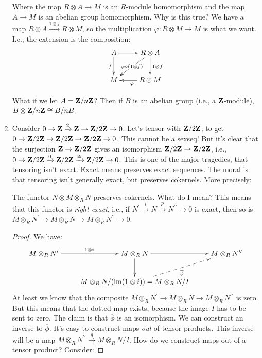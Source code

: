 \begin{enumerate}
Where the map $R\otimes A\to M$ is an $R$-module homomorphism and the map $A\to M$ is an abelian group homomorphism. Why is this true? We have a map $R\otimes A\xrightarrow{1\otimes f}R\otimes M$, so the multiplication $\varphi:R\otimes M\to M$ is what we want. I.e., the extension is the composition:
\begin{equation*}
\xymatrix{A\ar[r]\ar[d]_f & R\otimes A\ar[d]^{1\otimes f}\ar[dl]|{\varphi\circ(1\otimes f)}\\
M & R\otimes M\ar[l]^{\varphi}}
\end{equation*}
\begin{example}
What if we let $A=\mathbf Z/n\mathbf Z$? Then if $B$ is an abelian group (i.e., a $\mathbf Z$-module), $B\otimes \mathbf Z/n\mathbf Z\cong B/nB$.
\end{example}
\item Consider $0\to \mathbf Z\xrightarrow{2}\mathbf Z\to \mathbf Z/2\mathbf Z\to 0$. Let's tensor with $\mathbf Z/2\mathbf Z$, to get $0\to \mathbf Z/2\mathbf Z\to\mathbf Z/2\mathbf Z\to\mathbf Z/2\mathbf Z\to 0$. This cannot be a sexseq! But it's clear that the surjection $\mathbf Z\to\mathbf Z/2\mathbf Z$ gives an isomorphism $\mathbf Z/2\mathbf Z\to\mathbf Z/2\mathbf Z$, i.e., $0\to \mathbf Z/2\mathbf Z\xrightarrow{0}\mathbf Z/2\mathbf Z\xrightarrow{\cong}\mathbf Z/2\mathbf Z\to 0$. This is one of the major tragedies, that tensoring isn't exact. Exact means preserves exact sequences. The moral is that tensoring isn't generally exact, but preserves cokernels. More precisely:
\begin{prop}
The functor $N\otimes M\otimes_R N$ preserves cokernels. What do I mean? This means that this functor is \emph{right exact}, i.e., if $N^\prime\xrightarrow{i} N\xrightarrow{p} N^{\prime\prime}\to 0$ is exact, then so is $M\otimes_R N^\prime\to M\otimes_R N\to M\otimes_R N^{\prime\prime}\to 0$.
\end{prop}
\begin{proof}
We have:
\begin{equation*}
\xymatrix{M\otimes_R N^\prime\ar[r]^{1\otimes i} & M\otimes_R N\ar[r]\ar[d] & M\otimes_R N^{\prime\prime}\\
 & M\otimes_R N/(\img(1\otimes i))=M\otimes_R N/I\ar@{-->}[ur]_{\overline{\phi}}}
\end{equation*}
At least we know that the composite $M\otimes_R N^\prime\to M\otimes_R N\to M\otimes_R N^{\prime\prime}$ is zero. But this means that the dotted map exists, because the image $I$ has to be sent to zero. The claim is that $\overline{\phi}$ is an isomorphism. We can construct an inverse to $\overline{\phi}$. It's easy to construct maps \emph{out} of tensor products. This inverse will be a map $M\otimes_R N^{\prime\prime}\xrightarrow{q}M\otimes_R N/I$. How do we construct maps out of a tensor product? Consider:

\end{proof}
\end{enumerate}
